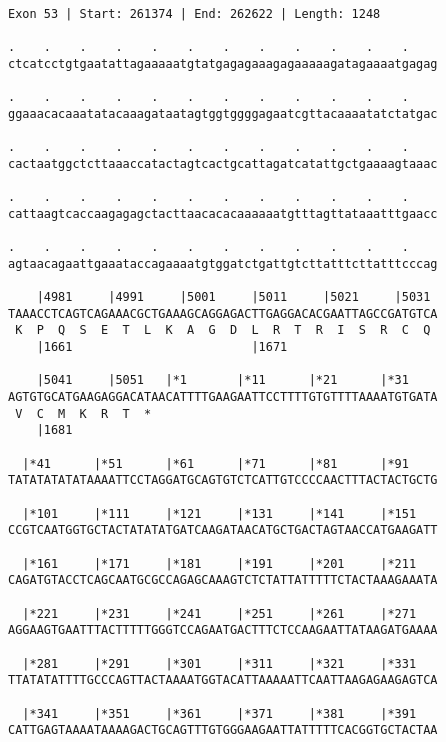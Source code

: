 \documentclass{article}
\begin{document}
\newpage
\begin{Verbatim}[fontfamily=courier]
Exon 53 | Start: 261374 | End: 262622 | Length: 1248

.    .    .    .    .    .    .    .    .    .    .    .    
ctcatcctgtgaatattagaaaaatgtatgagagaaagagaaaaagatagaaaatgagag

.    .    .    .    .    .    .    .    .    .    .    .    
ggaaacacaaatatacaaagataatagtggtggggagaatcgttacaaaatatctatgac

.    .    .    .    .    .    .    .    .    .    .    .    
cactaatggctcttaaaccatactagtcactgcattagatcatattgctgaaaagtaaac

.    .    .    .    .    .    .    .    .    .    .    .    
cattaagtcaccaagagagctacttaacacacaaaaaatgtttagttataaatttgaacc

.    .    .    .    .    .    .    .    .    .    .    .    
agtaacagaattgaaataccagaaaatgtggatctgattgtcttatttcttatttcccag

    |4981     |4991     |5001     |5011     |5021     |5031 
TAAACCTCAGTCAGAAACGCTGAAAGCAGGAGACTTGAGGACACGAATTAGCCGATGTCA
 K  P  Q  S  E  T  L  K  A  G  D  L  R  T  R  I  S  R  C  Q 
    |1661                         |1671                     

    |5041     |5051   |*1       |*11      |*21      |*31    
AGTGTGCATGAAGAGGACATAACATTTTGAAGAATTCCTTTTGTGTTTTAAAATGTGATA
 V  C  M  K  R  T  *   
    |1681                                                   

  |*41      |*51      |*61      |*71      |*81      |*91    
TATATATATATAAAATTCCTAGGATGCAGTGTCTCATTGTCCCCAACTTTACTACTGCTG

  |*101     |*111     |*121     |*131     |*141     |*151   
CCGTCAATGGTGCTACTATATATGATCAAGATAACATGCTGACTAGTAACCATGAAGATT

  |*161     |*171     |*181     |*191     |*201     |*211   
CAGATGTACCTCAGCAATGCGCCAGAGCAAAGTCTCTATTATTTTTCTACTAAAGAAATA

  |*221     |*231     |*241     |*251     |*261     |*271   
AGGAAGTGAATTTACTTTTTGGGTCCAGAATGACTTTCTCCAAGAATTATAAGATGAAAA

  |*281     |*291     |*301     |*311     |*321     |*331   
TTATATATTTTGCCCAGTTACTAAAATGGTACATTAAAAATTCAATTAAGAGAAGAGTCA

  |*341     |*351     |*361     |*371     |*381     |*391   
CATTGAGTAAAATAAAAGACTGCAGTTTGTGGGAAGAATTATTTTTCACGGTGCTACTAA

\end{Verbatim}
\newpage
\end{document}

